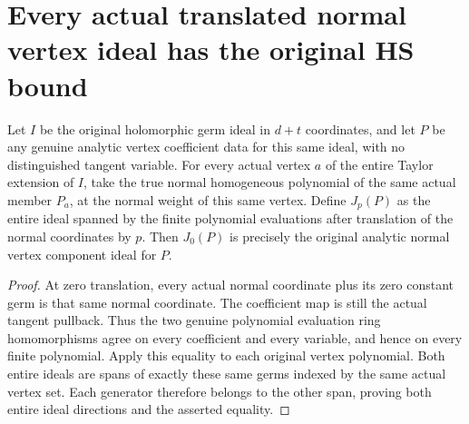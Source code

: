 \section{Every actual translated normal vertex ideal has the original HS bound}

\begin{theorem}
\label{hir:actual-translated-normal-vertex-zero-ideal}
\leanok
Let $I$ be the original holomorphic germ ideal in $d+t$ coordinates, and
let $P$ be any genuine analytic vertex coefficient data for this same
ideal, with no distinguished tangent variable. For every actual vertex
$a$ of the entire Taylor extension of $I$, take the true normal
homogeneous polynomial of the same actual member $P_a$, at the normal
weight of this same vertex. Define $J_p(P)$ as the entire ideal spanned
by the finite polynomial evaluations after translation of the normal
coordinates by $p$. Then $J_0(P)$ is precisely the original analytic
normal vertex component ideal for $P$.
\end{theorem}
\begin{proof}
At zero translation, every actual normal coordinate plus its zero
constant germ is that same normal coordinate. The coefficient map is
still the actual tangent pullback. Thus the two genuine polynomial
evaluation ring homomorphisms agree on every coefficient and every
variable, and hence on every finite polynomial. Apply this equality to
each original vertex polynomial. Both entire ideals are spans of
exactly these same germs indexed by the same actual vertex set. Each
generator therefore belongs to the other span, proving both entire
ideal directions and the asserted equality.
\end{proof}

